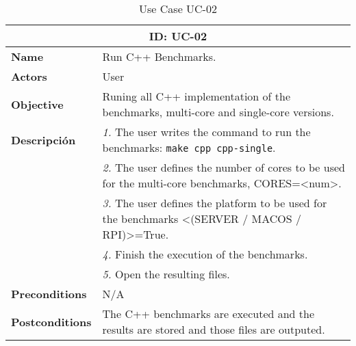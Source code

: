 \begin{table}[H]
    \centering
    \begin{tabular}{l p{10cm}}
        \toprule
        \multicolumn{2}{c}{\textbf{ID: UC-02}} \\
        \toprule
        \textbf{Name}                         &  Run C++ Benchmarks. \\
        \textbf{Actors}                       &  User \\
        \textbf{Objective}                    &  Runing all C++ implementation of the benchmarks, multi-core and single-core versions. \\
        \multirow{1}{*}{\textbf{Descripción}} & \textsl{1.} The user writes the command to run the benchmarks: \texttt{make cpp cpp-single}.\\
                                              & \textsl{2.} The user defines the number of cores to be used for the multi-core benchmarks, CORES=<num>.\\
                                              & \textsl{3.} The user defines the platform to be used for the benchmarks <(SERVER / MACOS / RPI)>=True.\\
                                              & \textsl{4.} Finish the execution of the benchmarks.\\
                                              & \textsl{5.} Open the resulting files.\\ 
        \textbf{Preconditions}                &  N/A \\
        \textbf{Postconditions}               &  The C++ benchmarks are executed and the results are stored and those files are outputed. \\
    \end{tabular}
    \caption{Use Case UC-02}
    \label{tab:uc-single-core 02}
\end{table}

